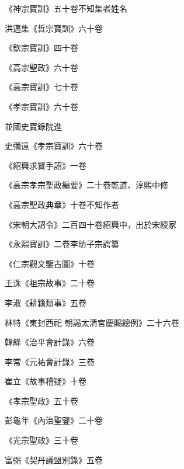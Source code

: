 \begin{pinyinscope}
 《神宗寶訓》五十卷不知集者姓名



 洪邁集《哲宗寶訓》六十卷



 《欽宗寶訓》四十卷



 《高宗聖政》六十卷



 《高宗寶訓》七十卷



 《孝宗寶訓》六十卷



 並國史寶錄院進



 史彌遠《孝宗寶訓》六十卷



 《紹興求賢手詔》一卷



 《高宗孝宗聖政編要》二十卷乾道、淳熙中修



 《高宗聖政典章》十卷不知作者



 《宋朝大詔令》二百四十卷紹興中，出於宋綬家



 《永熙寶訓》二卷李昉子宗諤纂



 《仁宗觀文鑒古圖》十卷



 王洙《祖宗故事》二十卷



 李淑《耕籍類事》五卷



 林特《東封西祀
 朝謁太清宮慶賜總例》二十六卷



 韓絳《治平會計錄》六卷



 李常《元祐會計錄》三卷



 崔立《故事稽疑》十卷



 《孝宗聖政》五十卷



 彭龜年《內治聖鑒》二十卷



 《光宗聖政》三十卷



 富弼《契丹議盟別錄》五卷




\end{pinyinscope}
